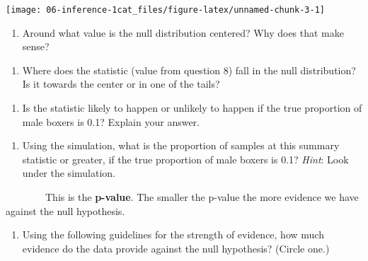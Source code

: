 \documentclass[
]{report}
\providecommand{\tightlist}{%
  \setlength{\itemsep}{0pt}\setlength{\parskip}{0pt}}
\begin{document}
\begin{center}\texttt{[image: 06-inference-1cat\_files/figure-latex/unnamed-chunk-3-1]} \end{center}

\newpage

\begin{enumerate}
\def\labelenumi{\arabic{enumi}.}
\setcounter{enumi}{18}
\tightlist
\item
  Around what value is the null distribution centered? Why does that make sense?
\end{enumerate}

\vspace{1in}

\begin{enumerate}
\def\labelenumi{\arabic{enumi}.}
\setcounter{enumi}{19}
\tightlist
\item
  Where does the statistic (value from question 8) fall in the null distribution? Is it towards the center or in one of the tails?
\end{enumerate}

\vspace{1in}

\begin{enumerate}
\def\labelenumi{\arabic{enumi}.}
\setcounter{enumi}{20}
\tightlist
\item
  Is the statistic likely to happen or unlikely to happen if the true proportion of male boxers is 0.1? Explain your answer.
\end{enumerate}

\vspace{1in}

\begin{enumerate}
\def\labelenumi{\arabic{enumi}.}
\setcounter{enumi}{21}
\tightlist
\item
  Using the simulation, what is the proportion of samples at this summary statistic or greater, if the true proportion of male boxers is 0.1? \emph{Hint}: Look under the simulation.
\end{enumerate}

\vspace{1in}

~~~~~~~~This is the \textbf{p-value}. The smaller the p-value the more evidence we have against the null hypothesis.

\begin{enumerate}
\def\labelenumi{\arabic{enumi}.}
\setcounter{enumi}{22}
\tightlist
\item
  Using the following guidelines for the strength of evidence, how much evidence do the data provide against the null hypothesis? (Circle one.)
\end{enumerate}
\end{document}

